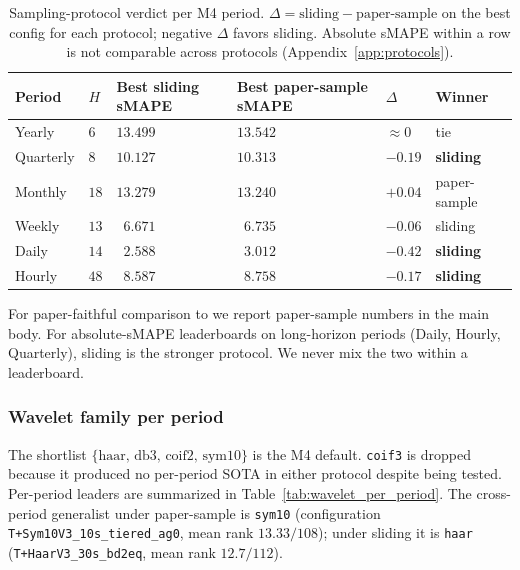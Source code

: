 \documentclass{article}
\begin{document}
\begin{table}[h]
\centering
\small
\caption{Sampling-protocol verdict per M4 period. $\Delta = \text{sliding} - \text{paper-sample}$ on the best config for each protocol; negative $\Delta$ favors sliding. Absolute sMAPE within a row is not comparable across protocols (Appendix~\ref{app:protocols}).}
\label{tab:protocol_per_period}
\begin{tabular}{@{}llllll@{}}
\toprule
Period & $H$ & Best sliding sMAPE & Best paper-sample sMAPE & $\Delta$ & Winner \\
\midrule
Yearly    & $6$  & $13.499$ & $13.542$ & $\approx 0$ & tie \\
Quarterly & $8$  & $10.127$ & $10.313$ & $-0.19$ & \textbf{sliding} \\
Monthly   & $18$ & $13.279$ & $13.240$ & $+0.04$ & paper-sample \\
Weekly    & $13$ & $\phantom{0}6.671$ & $\phantom{0}6.735$ & $-0.06$ & sliding \\
Daily     & $14$ & $\phantom{0}2.588$ & $\phantom{0}3.012$ & $\mathbf{-0.42}$ & \textbf{sliding} \\
Hourly    & $48$ & $\phantom{0}8.587$ & $\phantom{0}8.758$ & $-0.17$ & \textbf{sliding} \\
\bottomrule
\end{tabular}
\end{table}

For paper-faithful comparison to \citet{oreshkin2020nbeats} we report paper-sample numbers in the main body. For absolute-sMAPE leaderboards on long-horizon periods (Daily, Hourly, Quarterly), sliding is the stronger protocol. We never mix the two within a leaderboard.

\subsubsection{Wavelet family per period}
\label{app:hyperparams:wavelet}

The shortlist $\{\text{haar},\,\text{db3},\,\text{coif2},\,\text{sym10}\}$ is the M4 default. \texttt{coif3} is dropped because it produced no per-period SOTA in either protocol despite being tested. Per-period leaders are summarized in Table~\ref{tab:wavelet_per_period}. The cross-period generalist under paper-sample is \texttt{sym10} (configuration \texttt{T+Sym10V3\_10s\_tiered\_ag0}, mean rank $13.33/108$); under sliding it is \texttt{haar} (\texttt{T+HaarV3\_30s\_bd2eq}, mean rank $12.7/112$).
\end{document}

